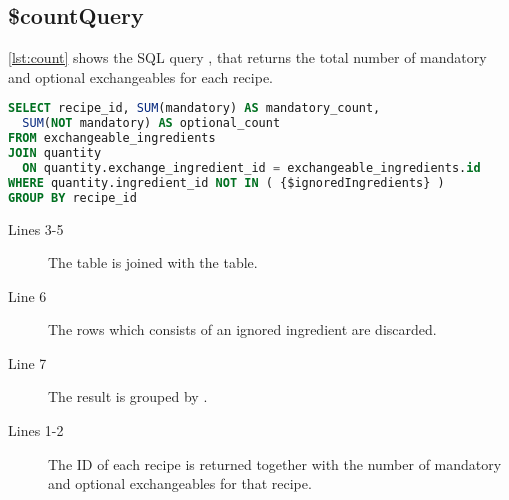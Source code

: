 \subsection*{\$countQuery}
\autoref{lst:count} shows the SQL query , that returns the total number of mandatory and optional exchangeables for each recipe.
\begin{lstlisting}[language=SQL, float=h, label={lst:count}, caption={\$countQuery, returns the total number of mandatory and optional exchangeables for each recipe.}]
SELECT recipe_id, SUM(mandatory) AS mandatory_count,
  SUM(NOT mandatory) AS optional_count
FROM exchangeable_ingredients
JOIN quantity
  ON quantity.exchange_ingredient_id = exchangeable_ingredients.id
WHERE quantity.ingredient_id NOT IN ( {$ignoredIngredients} )
GROUP BY recipe_id
\end{lstlisting}
\begin{description}
\item[Lines 3-5] The  table is joined with the  table.
\item[Line 6] The rows which consists of an ignored ingredient are discarded.
\item[Line 7] The result is grouped by .
\item[Lines 1-2] The ID of each recipe is returned together with the number of mandatory and optional exchangeables for that recipe.
\end{description}



